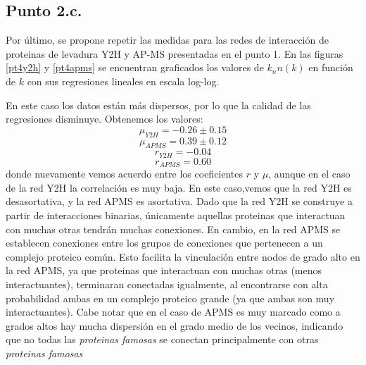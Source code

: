 \documentclass{article}
\begin{document}
\subsection{Punto 2.c.}
Por último, se propone repetir las medidas para las redes de interacción de proteinas de levadura Y2H y AP-MS presentadas en el punto 1. En las figuras \ref{pt4y2h} y \ref{pt4apms} se encuentran graficados los valores de $k_nn(k)$ en función de $k$ con sus regresiones lineales en escala log-log.

En este caso los datos están más dispersos, por lo que la calidad de las regresiones disminuye. Obtenemos los valores:
\begin{equation}
\mu_{Y2H} = -0.26 \pm 0.15
\end{equation}
\begin{equation}
\mu_{APMS} = 0.39 \pm 0.12 
\end{equation}
\begin{equation}
r_{Y2H} = -0.04
\end{equation}
\begin{equation}
r_{APMS} = 0.60 
\end{equation}
donde nuevamente vemos acuerdo entre los coeficientes $r$ y $\mu$, aunque en el caso de la red Y2H la correlación es muy baja. En este caso,vemos que la red Y2H es desasortativa, y la red APMS es asortativa. Dado que la red Y2H se construye a partir de interacciones binarias, únicamente aquellas proteinas que interactuan con muchas otras tendrán muchas conexiones. En cambio, en la red APMS se establecen conexiones entre los grupos de conexiones que pertenecen a un complejo proteico común. Esto facilita la vinculación entre nodos de grado alto en la red APMS, ya que proteinas que interactuan con muchas otras (menos interactuantes), terminaran conectadas igualmente, al encontrarse con alta probabilidad ambas en un complejo proteico grande (ya que ambas son muy interactuantes). Cabe notar que en el caso de APMS es muy marcado como a grados altos hay mucha dispersión en el grado medio de los vecinos, indicando que no todas las \textit{proteinas famosas} se conectan principalmente con otras \textit{proteinas famosas}
\end{document}

